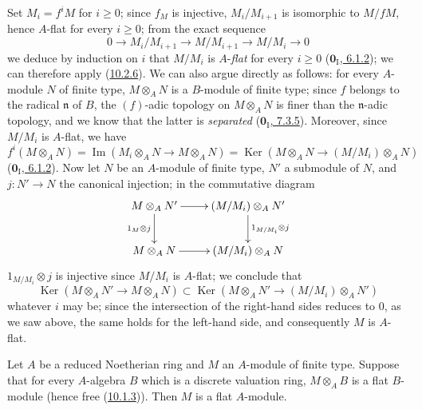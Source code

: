 Set $M_i=f^iM$ for $i\geq0$; since $f_M$ is injective,
$M_i/M_{i+1}$ is isomorphic to $M/fM$, hence $A$-flat for every $i\geq0$; from
the exact sequence
\[
  0\longrightarrow M_i/M_{i+1}\longrightarrow M/M_{i+1}
  \longrightarrow M/M_i\longrightarrow0
\]
we deduce by induction on $i$ that $M/M_i$ is $A$-\emph{flat} for every
$i\geq0$ (\hyperref[0.6.1.2]{$\mathbf{0}_{\mathrm I}$, 6.1.2}); we can therefore
apply (\hyperref[0.10.2.6]{10.2.6}). We can also argue directly
as follows: for every $A$-module $N$ of finite type, $M\otimes_A N$ is a
$B$-module of finite type; since $f$ belongs to the radical $\mathfrak n$ of
$B$, the $(f)$-adic topology on $M\otimes_A N$ is finer than the
$\mathfrak n$-adic topology, and we know that the latter is \emph{separated}
(\hyperref[0.7.3.5]{$\mathbf{0}_{\mathrm I}$, 7.3.5}). Moreover, since $M/M_i$ is
$A$-flat, we have
\[
  f^i(M\otimes_A N)=\operatorname{Im}(M_i\otimes_A N\to M\otimes_A N)
  =\operatorname{Ker}(M\otimes_A N\to(M/M_i)\otimes_A N)
\]
(\hyperref[0.6.1.2]{$\mathbf{0}_{\mathrm I}$, 6.1.2}). Now let $N$ be an
$A$-module of finite type, $N'$ a submodule of $N$, and $j:N'\to N$ the canonical
injection; in the commutative diagram
\[
\xymatrix{
  M\otimes_A N'\ar[r]\ar[d]_{1_M\otimes j} &
  (M/M_i)\otimes_A N'\ar[d]^{1_{M/M_i}\otimes j}\\
  M\otimes_A N\ar[r] & (M/M_i)\otimes_A N
}
\]
$1_{M/M_i}\otimes j$ is injective since $M/M_i$ is $A$-flat; we
conclude that
\[
  \operatorname{Ker}(M\otimes_A N'\to M\otimes_A N)
  \subset\operatorname{Ker}(M\otimes_A N'\to(M/M_i)\otimes_A N')
\]
whatever $i$ may be; since the intersection of the right-hand sides reduces to
$0$, as we saw above, the same holds for the left-hand side, and
consequently $M$ is $A$-flat.

\begin{proposition}[10.2.8]
\label{0.10.2.8}
Let $A$ be a reduced Noetherian ring and $M$ an $A$-module of finite type.
Suppose that for every $A$-algebra $B$ which is a discrete valuation
ring, $M\otimes_A B$ is a flat $B$-module (hence free
\textup{(\hyperref[0.10.1.3]{10.1.3})}). Then $M$ is a flat $A$-module.
\end{proposition}

